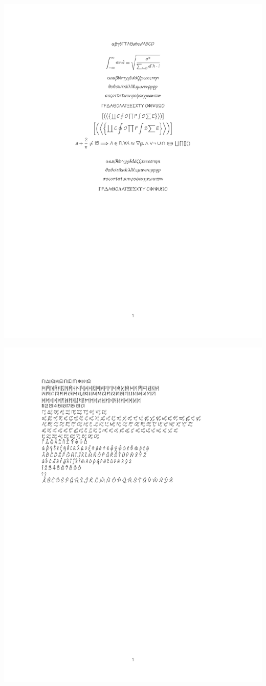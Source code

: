 \documentclass[twocolumn]{article}
\begin{document}
 \noindent\includegraphics*{../results/tekton-font}\par
{} \noindent\includegraphics*{../results/tekton-pos}\par
\end{document}
